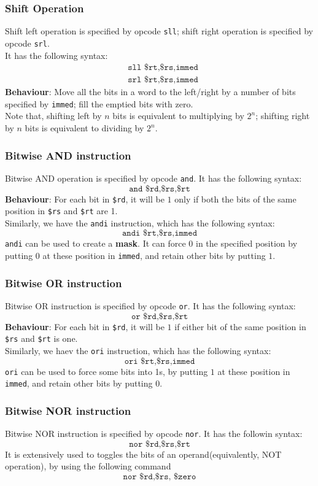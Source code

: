 \documentclass[12pt]{article}
\theoremstyle{definition}
\begin{document}
\subsubsection{Shift Operation}
Shift left operation is specified by opcode \texttt{sll}; shift right operation is specified by opcode \texttt{srl}.\\
It has the following syntax:
\begin{align*}
&\texttt{sll \$rt,\$rs,immed}\\
&\texttt{srl \$rt,\$rs,immed}
\end{align*}
\textbf{Behaviour}: Move all the bits in a word to the left/right by a number of bits specified by \texttt{immed}; fill the emptied bits with zero.\\
Note that, shifting left by $n$ bits is equivalent to multiplying by $2^n$; shifting right by $n$ bits is equivalent to dividing by $2^n$.
\subsubsection{Bitwise AND instruction}
Bitwise AND operation is specified by opcode \texttt{and}. It has the following syntax:
\[
\texttt{and \$rd,\$rs,\$rt}
\]
\textbf{Behaviour}: For each bit in \texttt{\$rd}, it will be $1$ only if both the bits of the same position in \texttt{\$rs} and \texttt{\$rt} are 1.\\
Similarly, we have the \texttt{andi} instruction, which has the following syntax:
\[
\texttt{andi \$rt,\$rs,immed}
\]
\texttt{andi} can be used to create a \textbf{mask}. It can force $0$ in the specified position by putting $0$ at these position in \texttt{immed}, and retain other bits by putting $1$.
\subsubsection{Bitwise OR instruction}
Bitwise OR instruction is specified by opcode \texttt{or}. It has the following syntax:
\[
\texttt{or \$rd,\$rs,\$rt}
\]
\textbf{Behaviour}: For each bit in \texttt{\$rd}, it will be $1$ if either bit of the same position in \texttt{\$rs} and \texttt{\$rt} is one.\\
Similarly, we haev the \texttt{ori} instruction, which has the following syntax:
\[
\texttt{ori \$rt,\$rs,immed}
\]
\texttt{ori} can be used to force some bits into 1s, by putting $1$ at these position in \texttt{immed}, and retain other bits by putting $0$.
\subsubsection{Bitwise NOR instruction}
Bitwise NOR instruction is specified by opcode \texttt{nor}. It has the followin syntax:
\[
\texttt{nor \$rd,\$rs,\$rt}
\]
It is extensively used to toggles the bits of an operand(equivalently, NOT operation), by using the following command
\[
\texttt{nor \$rd,\$rs, \$zero}
\]
\end{document}
